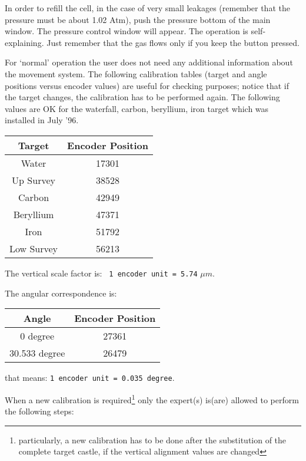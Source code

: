 In order to refill the cell, in the case of very small leakages 
(remember that the 
pressure must be about 1.02 Atm),
push the pressure bottom of the main window. The pressure control 
window will appear. The operation is self-explaining. Just remember that 
the gas flows only if you keep the button pressed. \\


For `normal' operation the user does not need any additional information about 
the movement system. 
The following calibration tables (target and angle positions versus encoder 
values) are useful for checking purposes; notice that if the target changes,
the calibration has to be performed again. The following values are OK
for the waterfall, carbon, beryllium, iron target which was 
installed in July '96.

\begin{center}
\begin{tabular}{|c|c|}
\hline
Target & Encoder Position \\
\hline
\hline
Water & 17301 \\
\hline
Up Survey & 38528 \\
\hline
Carbon & 42949 \\
\hline
Beryllium & 47371 \\
\hline
Iron & 51792 \\
\hline
Low Survey & 56213 \\
\hline
\end{tabular}
\end{center}

The vertical scale factor is: \verb: 1 encoder unit = 5.74: $\mu m$.

The angular correspondence is:

\begin{center}
\begin{tabular}{|c|c|}
\hline
Angle & Encoder Position \\
\hline
\hline
0 degree & 27361 \\
\hline
30.533 degree & 26479 \\
\hline
\end{tabular}
\end{center}

that means: \verb:1 encoder unit = 0.035 degree:.

When a new calibration is required\footnote{particularly, 
a new calibration has to be done 
after the substitution of the complete target castle, 
if the vertical alignment values are changed} 
only the expert(s) is(are) allowed to perform the following steps:

